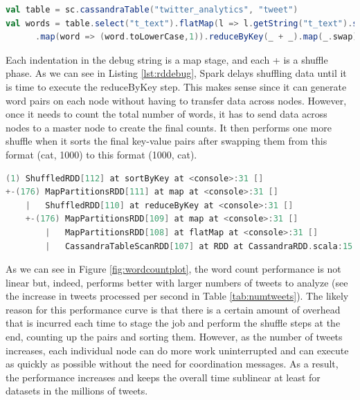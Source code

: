 \begin{lstlisting}[language=scala, caption={WordCount Spark script},float, floatplacement=H, label={lst:wordcount}]
val table = sc.cassandraTable("twitter_analytics", "tweet")
val words = table.select("t_text").flatMap(l => l.getString("t_text").split(" "))
      .map(word => (word.toLowerCase,1)).reduceByKey(_ + _).map(_.swap).sortByKey(false,1)
\end{lstlisting}



Each indentation in the debug string is a map stage, and each + is a shuffle phase. As we can see in Listing \ref{lst:rddebug}, Spark delays shuffling data until it is time to execute the reduceByKey step. This makes sense since it can generate word pairs on each node without having to transfer data across nodes. However, once it needs to count the total number of words, it has to send data across nodes to a master node to create the final counts. It then performs one more shuffle when it sorts the final key-value pairs after swapping them from this format (cat, 1000) to this format (1000, cat).



\begin{lstlisting}[language=scala, caption={Debug string rdd}, float, floatplacement=H, label={lst:rddebug}]
(1) ShuffledRDD[112] at sortByKey at <console>:31 []
+-(176) MapPartitionsRDD[111] at map at <console>:31 []
    |   ShuffledRDD[110] at reduceByKey at <console>:31 []
    +-(176) MapPartitionsRDD[109] at map at <console>:31 []
        |   MapPartitionsRDD[108] at flatMap at <console>:31 []
        |   CassandraTableScanRDD[107] at RDD at CassandraRDD.scala:15 []
\end{lstlisting}

As we can see in Figure \ref{fig:wordcountplot},  the word count performance is not linear but, indeed,  performs better with larger numbers of tweets to analyze (see the increase in tweets processed per second in Table \ref{tab:numtweets}). The likely reason for this performance curve is that there is a certain amount of overhead that is incurred each time to stage the job and perform the shuffle steps at the end, counting up the pairs and sorting them. However, as the number of tweets increases, each individual node can do more work uninterrupted and can execute as quickly as possible without the need for coordination messages. As a result, the performance increases and keeps the overall time sublinear at least for datasets in the millions of tweets.


